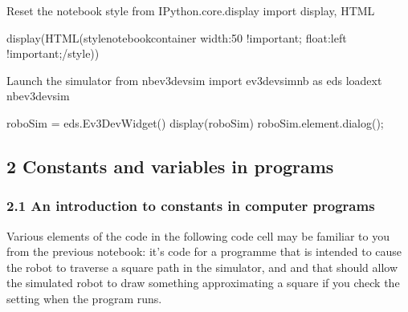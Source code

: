 \documentclass[letterpaper,10pt,english]{sphinxmanual}
\begin{document}
{
\begin{sphinxVerbatim}[commandchars=\\\{\}]
\llap{\color{nbsphinxin}[ ]:\,\hspace{\fboxrule}\hspace{\fboxsep}}\PYGZsh{} Reset the notebook style
from IPython.core.display import display, HTML

display(HTML(\PYGZdq{}\PYGZlt{}style\PYGZgt{}\PYGZsh{}notebook\PYGZhy{}container \PYGZob{} width:50\PYGZpc{} !important; float:left !important;\PYGZcb{}\PYGZlt{}/style\PYGZgt{}\PYGZdq{}))


\PYGZsh{}Launch the simulator
from nbev3devsim import ev3devsim\PYGZus{}nb as eds
\PYGZpc{}load\PYGZus{}ext nbev3devsim

roboSim = eds.Ev3DevWidget()
display(roboSim)
roboSim.element.dialog();
\end{sphinxVerbatim}
}


\subsection{2 Constants and variables in programs}
\label{\detokenize{content/01_Robot_Lab/Section_00_02:2-Constants-and-variables-in-programs}}\label{\detokenize{content/01_Robot_Lab/Section_00_02::doc}}

\subsubsection{2.1 An introduction to constants in computer programs}
\label{\detokenize{content/01_Robot_Lab/Section_00_02:2.1-An-introduction-to-constants-in-computer-programs}}
Various elements of the code in the following code cell may be familiar to you from the previous notebook: it’s code for a programme that is intended to cause the robot to traverse a square path in the simulator, and and that should allow the simulated robot to draw something approximating a square if you check the  setting when the program runs.
\end{document}
